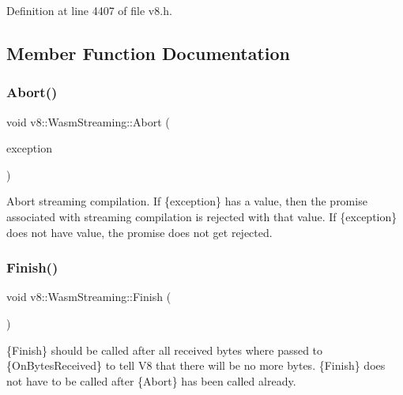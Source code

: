 Definition at line 4407 of file v8.\+h.



\subsection{Member Function Documentation}
\mbox{\label{classv8_1_1WasmStreaming_aca7399d97368360079e3030b2fb4fc94}} 
\subsubsection{\texorpdfstring{Abort()}{Abort()}}
{\footnotesize\ttfamily void v8\+::\+Wasm\+Streaming\+::\+Abort (\begin{DoxyParamCaption}\item[{\mbox{\hyperlink{classv8_1_1MaybeLocal}{Maybe\+Local}}$<$ \mbox{\hyperlink{classv8_1_1Value}{Value}} $>$}]{exception }\end{DoxyParamCaption})}

Abort streaming compilation. If \{exception\} has a value, then the promise associated with streaming compilation is rejected with that value. If \{exception\} does not have value, the promise does not get rejected. \mbox{\label{classv8_1_1WasmStreaming_a2c40c85c34643af871577ea98d792de6}} 
\subsubsection{\texorpdfstring{Finish()}{Finish()}}
{\footnotesize\ttfamily void v8\+::\+Wasm\+Streaming\+::\+Finish (\begin{DoxyParamCaption}{ }\end{DoxyParamCaption})}

\{Finish\} should be called after all received bytes where passed to \{On\+Bytes\+Received\} to tell V8 that there will be no more bytes. \{Finish\} does not have to be called after \{Abort\} has been called already. \mbox{\label{classv8_1_1WasmStreaming_ada886a06f191ac65897763bda60c2f54}} 
